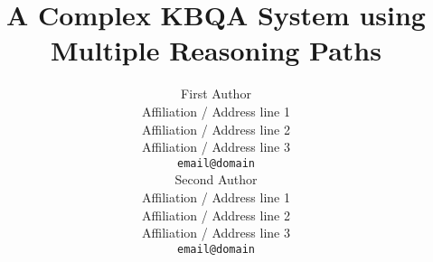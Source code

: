 \documentclass[11pt,a4paper]{article}
\title{A Complex KBQA System using Multiple Reasoning Paths}
\author{First Author \\
  Affiliation / Address line 1 \\
  Affiliation / Address line 2 \\
  Affiliation / Address line 3 \\
  \texttt{email@domain} \\\And
  Second Author \\
  Affiliation / Address line 1 \\
  Affiliation / Address line 2 \\
  Affiliation / Address line 3 \\
  \texttt{email@domain} \\}
\date{}
\begin{document}
\maketitle

\begin{abstract}

\end{abstract}











\clearpage
\newpage



\end{document}

